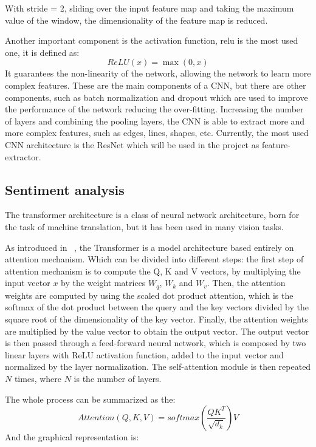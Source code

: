 With stride = 2, sliding over the input feature map and taking the maximum value of the window, the dimensionality of the feature map is reduced.

Another important component is the activation function, \gls{relu} is the most used one, it is defined as:
\begin{equation}
    ReLU(x) = \max(0, x)
    \label{eq:expression-relu}
\end{equation}
It guarantees the non-linearity of the network, allowing the network to learn more complex features.
These are the main components of a CNN, but there are other components, such as batch normalization and dropout which are used to improve the performance of the network reducing the over-fitting.
Increasing the number of layers and combining the pooling layers, the CNN is able to extract more and more complex features, such as edges, lines, shapes, etc.
Currently, the most used CNN architecture is the ResNet which will be used in the project as feature-extractor.

\subsection{Sentiment analysis}\label{subsec:sentiment-analysis}
The transformer architecture is a class of neural network architecture, born for the task of machine translation, but it has been used in many vision tasks.

As introduced in ~\cite{transformer_paper}, the Transformer is a model architecture based entirely on attention mechanism.
Which can be divided into different steps: the first step of attention mechanism is to compute the Q, K and V vectors, by multiplying the input vector $x$ by the weight matrices $W_q$, $W_k$ and $W_v$.
Then, the attention weights are computed by using the scaled dot product attention, which is the softmax of the dot product between the query and the key vectors divided by the square root of the dimensionality of the key vector.
Finally, the attention weights are multiplied by the value vector to obtain the output vector.
The output vector is then passed through a feed-forward neural network, which is composed by two linear layers with ReLU activation function, added to the input vector and normalized by the layer normalization.
The self-attention module is then repeated $N$ times, where $N$ is the number of layers.

The whole process can be summarized as the:
\begin{equation}
    Attention(Q, K, V) = softmax\left(\frac{QK^T}{\sqrt{d_k}}\right)V
    \label{eq:expression-scaled-dot-product}
\end{equation}
And the graphical representation is:

